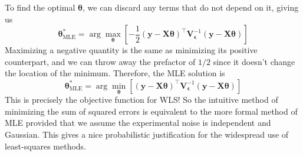 To find the optimal $\boldsymbol{\theta}$, we can discard any terms that do not depend on it, giving us
\begin{equation}
    \boldsymbol{\theta}_{\text{MLE}}^* = \arg\max_{\boldsymbol{\theta}} \left[ -\frac{1}{2}(\mathbf{y} - \mathbf{X}\boldsymbol{\theta})^\top \mathbf{V}_{\boldsymbol{\epsilon}}^{-1}(\mathbf{y} - \mathbf{X}\boldsymbol{\theta}) \right]
\end{equation}
Maximizing a negative quantity is the same as minimizing its positive counterpart, and we can throw away the prefactor of $1/2$ since it doesn't change the location of the minimum. Therefore, the MLE solution is
\begin{equation}
    \boldsymbol{\theta}_{\text{MLE}}^* = \arg\min_{\boldsymbol{\theta}} \left[ (\mathbf{y} - \mathbf{X}\boldsymbol{\theta})^\top \mathbf{V}_{\boldsymbol{\epsilon}}^{-1}(\mathbf{y} - \mathbf{X}\boldsymbol{\theta}) \right]
\end{equation}
This is precisely the objective function for WLS! So the intuitive method of minimizing the sum of squared errors is equivalent to the more formal method of MLE provided that we assume the experimental noise is independent and Gaussian. This gives a nice probabilistic justification for the widespread use of least-squares methods.


